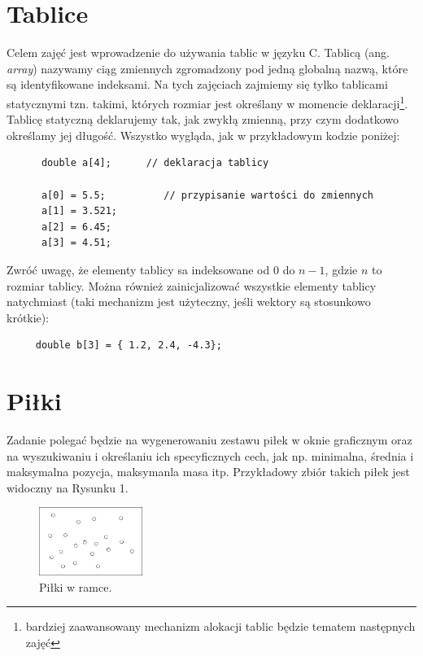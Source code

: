 \documentclass{instrukcja}
\begin{document}
\author{W. Regulski}
\materialtitle

\section*{Tablice}
Celem zajęć jest wprowadzenie do używania tablic w języku C. Tablicą (ang. {\it array}) nazywamy ciąg zmiennych zgromadzony pod jedną globalną nazwą, które są identyfikowane indeksami. 
Na tych zajęciach zajmiemy się tylko tablicami statycznymi tzn. takimi, których rozmiar jest określany w momencie deklaracji\footnote{bardziej zaawansowany mechanizm alokacji tablic będzie tematem następnych zajęć}.
Tablicę statyczną deklarujemy tak, jak zwykłą zmienną, przy czym dodatkowo określamy jej długość. Wszystko wygląda, jak w przykładowym kodzie poniżej:

\begin{verbatim}
      double a[4];    	// deklaracja tablicy

      a[0] = 5.5;		   // przypisanie wartości do zmiennych
      a[1] = 3.521;
      a[2] = 6.45;
      a[3] = 4.51;

\end{verbatim}
Zwróć uwagę, że elementy tablicy sa indeksowane od \(0\) do \(n-1\), gdzie \(n\) to rozmiar tablicy. Można również zainicjalizować wszystkie elementy tablicy natychmiast (taki mechanizm jest użyteczny, jeśli wektory są stosunkowo krótkie):
\begin{verbatim}
     double b[3] = { 1.2, 2.4, -4.3};
\end{verbatim}
\section*{Piłki}

Zadanie polegać będzie na wygenerowaniu zestawu piłek w oknie graficznym oraz na wyszukiwaniu i określaniu ich specyficznych cech, jak np. minimalna, średnia i maksymalna pozycja, maksymanla masa itp. Przykładowy zbiór takich piłek jest widoczny na Rysunku 1.
\begin{figure}
\centering
\includegraphics[width=0.3\textwidth]{kolka.pdf}

\caption{Piłki w ramce.}
\end{figure}
\end{document}
